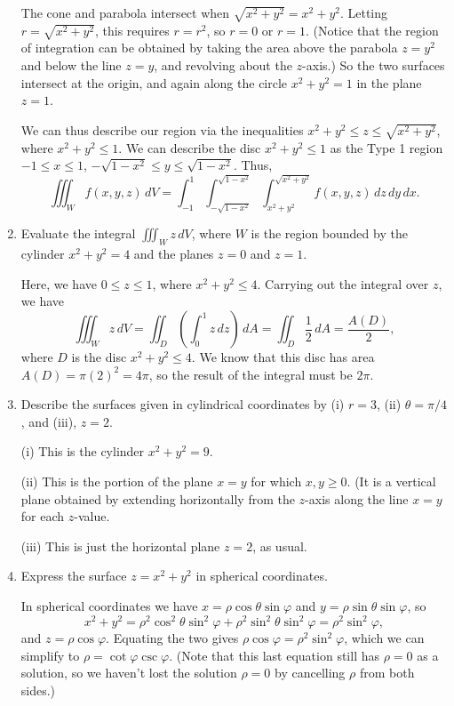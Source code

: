\documentclass[letterpaper,12pt]{article}
\newcommand{\di}{\displaystyle}
\renewcommand{\phi}{\varphi}
\begin{document}
\begin{enumerate}
\bigskip

The cone and parabola intersect when $\sqrt{x^2+y^2} = x^2+y^2$. Letting $r=\sqrt{x^2+y^2}$, this requires $r=r^2$, so $r=0$ or $r=1$. (Notice that the region of integration can be obtained by taking the area above the parabola $z=y^2$ and below the line $z=y$, and revolving about the $z$-axis.) So the two surfaces intersect at the origin, and again along the circle $x^2+y^2=1$ in the plane $z=1$.

We can thus describe our region via the inequalities $x^2+y^2\leq z\leq \sqrt{x^2+y^2}$, where $x^2+y^2\leq 1$. We can describe the disc $x^2+y^2\leq 1$ as the Type 1 region $-1\leq x\leq 1$, $-\sqrt{1-x^2}\leq y\leq \sqrt{1-x^2}$. Thus,
\[
 \iiint_W f(x,y,z)\,dV = \int_{-1}^1\int_{-\sqrt{1-x^2}}^{\sqrt{1-x^2}}\int_{x^2+y^2}^{\sqrt{x^2+y^2}}f(x,y,z)\,dz\,dy\,dx.
\]


 \item Evaluate the integral $\di \iiint_W z\,dV$, where $W$ is the region bounded by the cylinder $x^2+y^2=4$ and the planes $z=0$ and $z=1$.

\bigskip

Here, we have $0\leq z\leq 1$, where $x^2+y^2\leq 4$. Carrying out the integral over $z$, we have
\[
 \iiint_W z\,dV = \iint_D(\int_0^1 z\,dz)\,dA = \iint_D \frac{1}{2}\,dA = \frac{A(D)}{2},
\]
where $D$ is the disc $x^2+y^2\leq 4$. We know that this disc has area $A(D) = \pi(2)^2 = 4\pi$, so the result of the integral must be $2\pi$.

 \item Describe the surfaces given in cylindrical coordinates by (i) $r=3$, (ii) $\theta = \pi/4$, and (iii), $z=2$.

\bigskip

(i) This is the cylinder $x^2+y^2=9$.

(ii) This is the portion of the plane $x=y$ for which $x,y\geq 0$. (It is a vertical plane obtained by extending horizontally from the $z$-axis along the line $x=y$ for each $z$-value.

(iii) This is just the horizontal plane $z=2$, as usual.

 \item Express the surface $z=x^2+y^2$ in spherical coordinates.

\bigskip

In spherical coordinates we have $x=\rho\cos\theta\sin\phi$ and $y=\rho\sin\theta\sin\phi$, so
\[
 x^2+y^2 = \rho^2\cos^2\theta\sin^2\phi+\rho^2\sin^2\theta\sin^2\phi = \rho^2\sin^2\phi,
\]
and $z=\rho\cos\phi$. Equating the two gives $\rho\cos\phi = \rho^2\sin^2\phi$, which we can simplify to $\rho = \cot\phi\csc\phi$. (Note that this last equation still has $\rho=0$ as a solution, so we haven't lost the solution $\rho=0$ by cancelling $\rho$ from both sides.)
 \end{enumerate}
\end{document}
